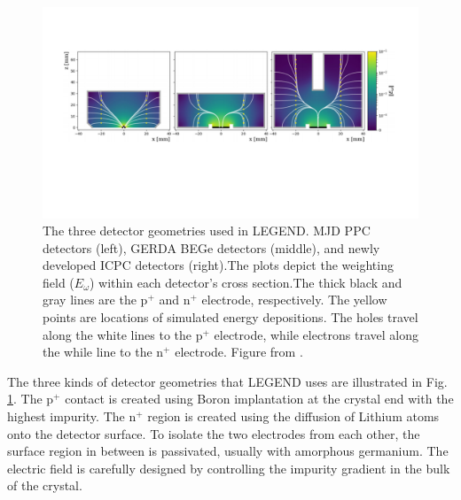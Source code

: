\begin{figure}
  \includegraphics[trim=15 30 15 20,clip,width=\linewidth]{ch2/figs/Det-geo-2.pdf}
\caption{The three detector geometries used in LEGEND. MJD PPC detectors (left), GERDA BEGe detectors (middle), and newly developed ICPC detectors (right).The plots depict the weighting field ($E_\omega$) within each detector's cross section.The thick black and gray lines are the p$^+$ and n$^+$ electrode, respectively. The yellow points are locations of simulated energy depositions. The holes travel along the white lines to the p$^+$ electrode, while electrons travel along the while line to the n$^+$ electrode. Figure from \cite{Comellato:2020ljj}.}
\label{fig:det-compare}
  \end{figure}
  
The three kinds of detector geometries that LEGEND uses are illustrated in Fig. \ref{fig:det-compare}. The p$^+$ contact is created using Boron implantation at the crystal end with the highest impurity. The n$^+$ region is created using the diffusion of Lithium atoms onto the detector surface. To isolate the two electrodes from each other, the surface region in between is passivated, usually with amorphous germanium. The electric field is carefully designed by controlling the impurity gradient in the bulk of the crystal. 


